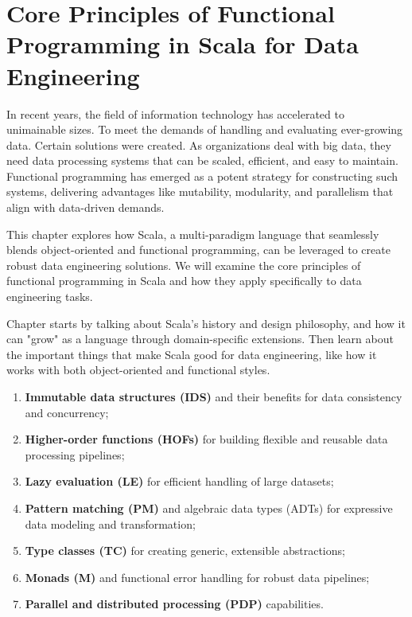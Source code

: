 \chapter{Core Principles of Functional Programming in Scala for Data Engineering}

In recent years, the field of information technology has accelerated to unimainable sizes. To meet the demands of handling and evaluating ever-growing data. Certain solutions were created. As organizations deal with big data, they need data processing systems that can be scaled, efficient, and easy to maintain. Functional programming has emerged as a potent strategy for constructing such systems, delivering advantages like mutability, modularity, and parallelism that align with data-driven demands.

This chapter explores how Scala, a multi-paradigm language that seamlessly blends object-oriented and functional programming, can be leveraged to create robust data engineering solutions. We will examine the core principles of functional programming in Scala and how they apply specifically to data engineering tasks.

Chapter starts by talking about Scala's history and design philosophy, and how it can "grow" as a language through domain-specific extensions. Then learn about the important things that make Scala good for data engineering, like how it works with both object-oriented and functional styles.
    \begin{enumerate}
        \item \textbf{Immutable data structures (IDS)} and their benefits for data consistency and concurrency;
        \item \textbf{Higher-order functions (HOFs)} for building flexible and reusable data processing pipelines;
        \item \textbf{Lazy evaluation (LE)} for efficient handling of large datasets;
        \item \textbf{Pattern matching (PM)} and algebraic data types (ADTs) for expressive data modeling and transformation;
        \item \textbf{Type classes (TC)} for creating generic, extensible abstractions;
        \item \textbf{Monads (M)} and functional error handling for robust data pipelines;
        \item \textbf{Parallel and distributed processing (PDP)} capabilities.
    \end{enumerate}

